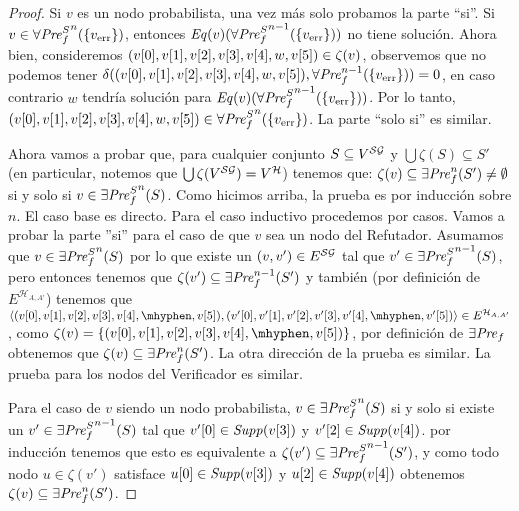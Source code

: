 \begin{proof}
        Si $v$ es un nodo probabilista, una vez más solo probamos la parte ``si''.   Si $v \in  {\SymbAFairpre}^n(\{ \ErrorSt \})$, entonces
        $\Eq(v)({\SymbAFairpre}^{n-1}(\{ \ErrorSt \}))$ no tiene solución.  Ahora bien, consideremos 
        $(\pr{0}{v},  \pr{1}{v}, \pr{2}{v}, \pr{3}{v}, \pr{4}{v}, w,\pr{5}{v}) \in \zeta(v)$, observemos que no podemos tener 
        $\delta((\pr{0}{v},  \pr{1}{v}, \pr{2}{v}, \pr{3}{v}, \pr{4}{v}, w,\pr{5}{v}),  \AFairpre^{n-1}(\{ \ErrorSt \})) = 0$,  en caso contrario
        $w$ tendría solución para  $\Eq(v)({\SymbAFairpre}^{n-1}(\{ \ErrorSt \}))$. Por lo tanto,  
        $(\pr{0}{v},  \pr{1}{v}, \pr{2}{v}, \pr{3}{v}, \pr{4}{v}, w,\pr{5}{v}) \in  {\SymbAFairpre}^n(\{ \ErrorSt \})$. La parte ``solo si'' es similar.
        
       Ahora vamos a probar que, para cualquier conjunto $S \subseteq V^{\SymbG}$ y $ \bigcup \zeta(S) \subseteq S'$ (en particular, notemos que $\bigcup \zeta(V^{\SymbG}) = V^{\mathcal{H}}$)
        tenemos que: 
       $\zeta(v) \subseteq  \EFairpre^n( S' ) \neq \emptyset$ si y solo si $v \in {\SymbEFairpre}^n( S )$. Como hicimos arriba, la prueba es por inducción sobre $n$.
       El caso base es directo.  Para el caso inductivo procedemos por casos.
       Vamos a probar la parte ''si'' para el caso de que $v$ sea un nodo del Refutador. Asumamos que $v \in  {\SymbEFairpre}^n( S )$ por lo que existe un $(v, v') \in E^{\SymbG}$ tal que $v' \in {\SymbEFairpre}^{n-1}( S )$,  pero entonces tenemos que $\zeta(v') \subseteq \EFairpre^{n-1}( S' )$ y también (por definición de $E^{\mathcal{H}_{A,A'}}$) tenemos que 
       $\langle (\pr{0}{v},\pr{1}{v},\pr{2}{v},\pr{3}{v},\pr{4}{v},\mhyphen, \pr{5}{v}),(\pr{0}{v'},\pr{1}{v'},\pr{2}{v'},\pr{3}{v'},\pr{4}{v'},\mhyphen,\pr{5}{v'}) \rangle \in E^{\mathcal{H}_{A,A'}}$,
       como $\zeta(v) = \{(\pr{0}{v},\pr{1}{v},\pr{2}{v},\pr{3}{v},\pr{4}{v},\mhyphen, \pr{5}{v})\}$, por definición de $\EFairpre$ obtenemos que
       $\zeta(v) \subseteq  \EFairpre^n( S' )$. La otra dirección de la prueba es similar. La prueba para los nodos del Verificador es similar.
       
       Para el caso de $v$ siendo un nodo probabilista,   $v \in  {\SymbEFairpre}^n( S )$ si y solo si existe un
       $v' \in  {\SymbEFairpre}^{n-1}( S )$ tal que $\pr{0}{v'} \in \support{\pr{3}{v}}$ y $\pr{2}{v'} \in \support{\pr{4}{v}}$.
       por inducción tenemos que esto es equivalente a $\zeta(v') \subseteq  {\SymbEFairpre}^{n-1}( S' )$, y como todo nodo $u \in \zeta(v')$ satisface
       $\pr{0}{u} \in \support{\pr{3}{v}}$ y $\pr{2}{u} \in \support{\pr{4}{v}}$ obtenemos $\zeta(v) \subseteq \EFairpre^n( S' )$.
       

\end{proof}
